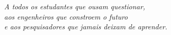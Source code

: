 \begin{dedicatoria}
    \vspace*{\fill}
    \noindent
    \begin{flushright}
    \textit{A todos os estudantes que ousam questionar,\\
    aos engenheiros que constroem o futuro\\
    e aos pesquisadores que jamais deixam de aprender.}
    \end{flushright}
    \vspace*{\fill}
\end{dedicatoria}
